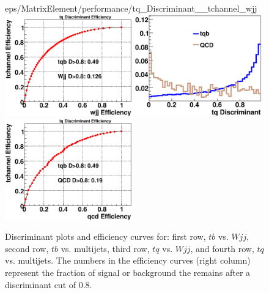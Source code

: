 \begin{figure}[!h!tbp]
{eps/MatrixElement/performance/tq_Discriminant__tchannel_wjj}
\includegraphics[width=0.49\textwidth]
{eps/MatrixElement/performance/tq_Efficiency__tchannel_wjj}
\includegraphics[width=0.49\textwidth]
{eps/MatrixElement/performance/tq_Discriminant__tchannel_qcd}
\includegraphics[width=0.49\textwidth]
{eps/MatrixElement/performance/tq_Efficiency__tchannel_qcd}
\caption{Discriminant plots and efficiency curves for:
first row, $tb$ vs. $Wjj$, second row, $tb$ vs. multijets, third row,
$tq$ vs. $Wjj$, and fourth row, $tq$ vs. multijets. The numbers in the
efficiency curves (right column) represent the fraction of signal or
background the remains after a discriminant cut of 0.8.}
\label{disc_wjets}
\end{figure}

